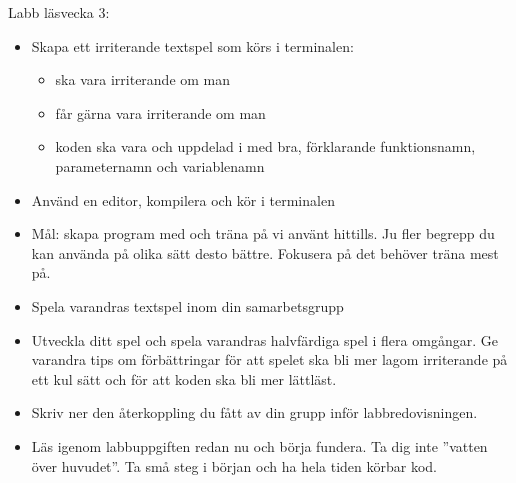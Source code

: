 \begin{SlideExtra}{Labb läsvecka 3:  \texttt{\LabWeekTHREE}}\SlideFontSmall
\begin{itemize}
\item Skapa ett  irriterande textspel som körs i terminalen:
\begin{itemize}\SlideFontTiny
  \item ska vara  irriterande om man 
  \item får gärna vara  irriterande om man 
  \item koden ska vara  och uppdelad i  med bra, förklarande funktionsnamn, parameternamn och variablenamn
\end{itemize}
\item Använd en editor, kompilera och kör i terminalen
\item Mål: skapa  program med  och träna på  vi använt hittills. Ju fler begrepp du kan använda på olika sätt desto bättre. Fokusera på det  behöver träna mest på.
\item Spela varandras textspel inom din samarbetsgrupp
\item Utveckla ditt spel  och spela varandras halvfärdiga spel i flera omgångar. Ge varandra tips om förbättringar för att spelet ska bli mer lagom irriterande på ett kul sätt och för att koden ska bli mer lättläst.
\item Skriv ner den återkoppling du fått av din grupp inför labbredovisningen.
\item Läs igenom labbuppgiften redan nu och börja fundera. Ta dig inte ''vatten över huvudet''. Ta små steg i början och ha hela tiden körbar kod.


\end{itemize}
\end{SlideExtra}
\fi
